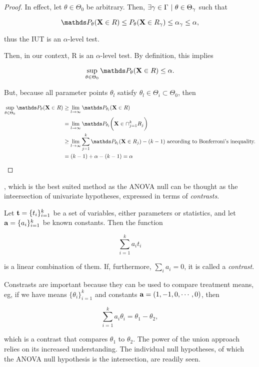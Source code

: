\documentclass{homework}
\begin{document}
{\begin{proof}
In effect, let $\theta \in \Theta_0$ be arbitrary. Then, $\exists \gamma \in \Gamma \textnormal{ } | \textnormal{ } \theta \in \Theta_\gamma $ such that 

$$
\prob_{\theta}({\bf X} \in R) \leq P_{\theta}({\bf X} \in R_{\gamma}) \leq \alpha_{\gamma} \leq \alpha,
$$

thus the IUT is an $\alpha$-level test. 

Then, in our context, R is an $\alpha$-level test. By definition, this implies 

$$
\sup_{\theta \in \Theta_0} \prob_{\theta} (\X \in R) \leq \alpha.
$$

But, because all parameter points $\theta_l$ satisfy $\theta_l \in \Theta_i \subset \Theta_0$, then

\begin{align*}
    \sup_{\theta \in \Theta_0} \prob_{\theta} (\X \in R) &\geq \lim_{l \rightarrow \infty} \prob_{\theta_l}(\X \in R) \\
    & = \lim_{l \rightarrow \infty} \prob_{\theta_l}\bigg(\X \in \cap_{j=1}^k R_j\bigg) \\
    &\geq \lim_{l \rightarrow \infty}
    \sum_{j=1}^{k}  \prob_{\theta_l}(\X \in R_j) - (k-1) \textnormal{ according to Bonferroni's inequality.} \\
    &= (k-1)  + \alpha - (k-1) = \alpha
\end{align*}
\end{proof}}, which is the best suited method as the ANOVA null can be thought as the inteersection of univariate hypotheses, expressed in terms of \textit{contrasts}. 

\begin{df}

Let ${\bf t} =\{t_i\}_{i=1}^k$ be a set of variables, either parameters or statistics, and let ${\bf a} =\{a_i\}_{i=1}^k$ be known constants. Then the function 

$$
\sum_{i=1}^k a_i t_i 
$$

is a linear combination of them. If, furthermore, $\sum_{i} a_i = 0$, it is called a \textit{contrast}. \\
\end{df}

Constrasts are important because they can be used to compare treatment means, eg, if we have means $\{\theta_i\}_{i=1}^k$ and constants ${\bf a} = (1, -1, 0, \cdots, 0)$, then 

$$
\sum_{i=1}^{k} a_i \theta_i = \theta_1 - \theta_2,
$$

which is a contrast that compares $\theta_1$ to $\theta_2$. The power of the union approach relies on its increased understanding. The individual null hypotheses, of which the ANOVA null hypothesis is the intersection, are readily seen. 
\end{document}
